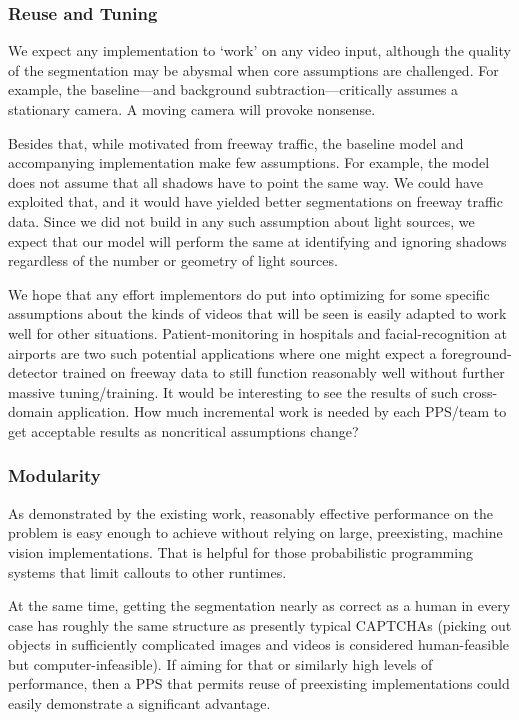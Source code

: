 \subsubsection{Reuse and Tuning}

We expect any implementation to `work' on any video input, although
the quality of the segmentation may be abysmal when core assumptions are
challenged.  For example, the baseline---and background
subtraction---critically assumes a stationary camera.  A moving camera
will provoke nonsense.

Besides that, while motivated from freeway
traffic, the baseline model and accompanying implementation  make few assumptions.
For example, the model does not assume that all shadows have to point
the same way.  We could have exploited that, and it would have yielded
better segmentations on freeway traffic data.    Since we did not build in any such assumption about light
sources, we expect that our model will perform the same at
identifying and ignoring shadows regardless of the number or geometry of light sources.

We hope that
any effort implementors do put into optimizing for some specific
assumptions about the kinds of videos that will be seen is easily
adapted to work well for other situations.  Patient-monitoring in
hospitals and facial-recognition at airports are two such potential applications
where one might expect a foreground-detector trained on freeway data
to still function reasonably well without further massive tuning/training.
It would be interesting to see the results of such cross-domain
application.  How much incremental work is needed by each PPS/team to get
acceptable results as noncritical assumptions change?


\subsubsection{Modularity}

As demonstrated by the existing work, 
reasonably effective performance on the problem is easy enough to
achieve without relying on large, preexisting, machine vision
implementations.  That is helpful for those probabilistic programming
systems that limit callouts to other runtimes.

At the same time, getting the segmentation nearly as correct as a
human in every case has roughly the same structure as presently typical
CAPTCHAs (picking out objects in sufficiently complicated images and
videos is considered human-feasible but computer-infeasible).
If aiming for that or similarly high
levels of performance, then a PPS that permits reuse of
preexisting implementations could easily demonstrate a significant
advantage.


